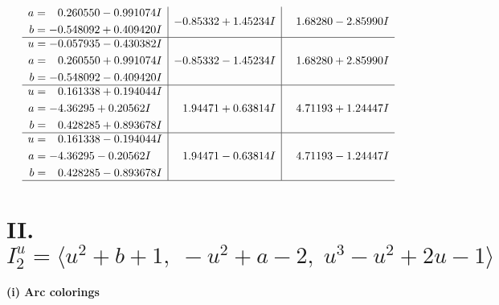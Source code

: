\documentclass[1p]{elsarticle_modified}
\theoremstyle{definition}
\begin{document}
$$\begin{array}{c|c|c}
\begin{aligned}
a &= \phantom{-}0.260550 - 0.991074 I \\
b &= -0.548092 + 0.409420 I\end{aligned}
 & -0.85332 + 1.45234 I & \phantom{-}1.68280 - 2.85990 I \\ \hline\begin{aligned}
u &= -0.057935 - 0.430382 I \\
a &= \phantom{-}0.260550 + 0.991074 I \\
b &= -0.548092 - 0.409420 I\end{aligned}
 & -0.85332 - 1.45234 I & \phantom{-}1.68280 + 2.85990 I \\ \hline\begin{aligned}
u &= \phantom{-}0.161338 + 0.194044 I \\
a &= -4.36295 + 0.20562 I \\
b &= \phantom{-}0.428285 + 0.893678 I\end{aligned}
 & \phantom{-}1.94471 + 0.63814 I & \phantom{-}4.71193 + 1.24447 I \\ \hline\begin{aligned}
u &= \phantom{-}0.161338 - 0.194044 I \\
a &= -4.36295 - 0.20562 I \\
b &= \phantom{-}0.428285 - 0.893678 I\end{aligned}
 & \phantom{-}1.94471 - 0.63814 I & \phantom{-}4.71193 - 1.24447 I\\
 \hline 
 \end{array}$$\newpage\newpage\renewcommand{\arraystretch}{1}
\centering \section*{II. $I^u_{2}= \langle u^2+b+1,\;- u^2+a-2,\;u^3- u^2+2 u-1 \rangle$}
\flushleft \textbf{(i) Arc colorings}\\
\end{document}
